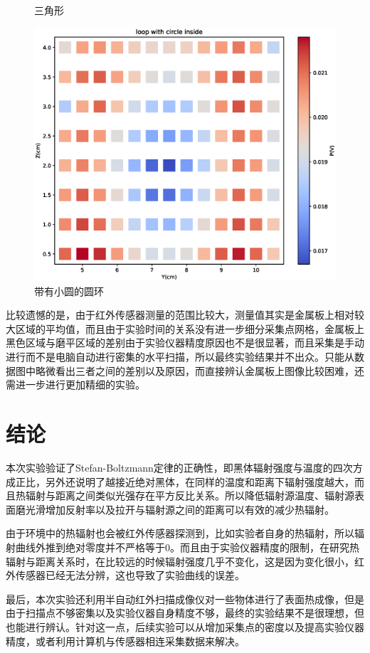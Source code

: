 \documentclass{WHUReport}
\begin{document}
\begin{multicols}{2}
\begin{figure}[H]
		\caption{三角形}
	\end{figure}
	\begin{figure}[H]
		\centering
		\includegraphics[width=\linewidth]{figs/4loop_circle.eps}
		\caption{带有小圆的圆环}
	\end{figure}
	
	比较遗憾的是，由于红外传感器测量的范围比较大，测量值其实是金属板上相对较大区域的平均值，而且由于实验时间的关系没有进一步细分采集点网格，金属板上黑色区域与磨平区域的差别由于实验仪器精度原因也不是很显著，而且采集是手动进行而不是电脑自动进行密集的水平扫描，所以最终实验结果并不出众。只能从数据图中略微看出三者之间的差别以及原因，而直接辨认金属板上图像比较困难，还需进一步进行更加精细的实验。
	\section{结\quad 论}
	本次实验验证了Stefan-Boltzmann定律的正确性，即黑体辐射强度与温度的四次方成正比，另外还说明了越接近绝对黑体，在同样的温度和距离下辐射强度越大，而且热辐射与距离之间类似光强存在平方反比关系。所以降低辐射源温度、辐射源表面磨光滑增加反射率以及拉开与辐射源之间的距离可以有效的减少热辐射。
	
	由于环境中的热辐射也会被红外传感器探测到，比如实验者自身的热辐射，所以辐射曲线外推到绝对零度并不严格等于$0$。而且由于实验仪器精度的限制，在研究热辐射与距离关系时，在比较远的时候辐射强度几乎不变化，这是因为变化很小，红外传感器已经无法分辨，这也导致了实验曲线的误差。
	
	最后，本次实验还利用半自动红外扫描成像仪对一些物体进行了表面热成像，但是由于扫描点不够密集以及实验仪器自身精度不够，最终的实验结果不是很理想，但也能进行辨认。针对这一点，后续实验可以从增加采集点的密度以及提高实验仪器精度，或者利用计算机与传感器相连采集数据来解决。
%	
	\small
%	
	
	
\end{multicols}
\end{document}
